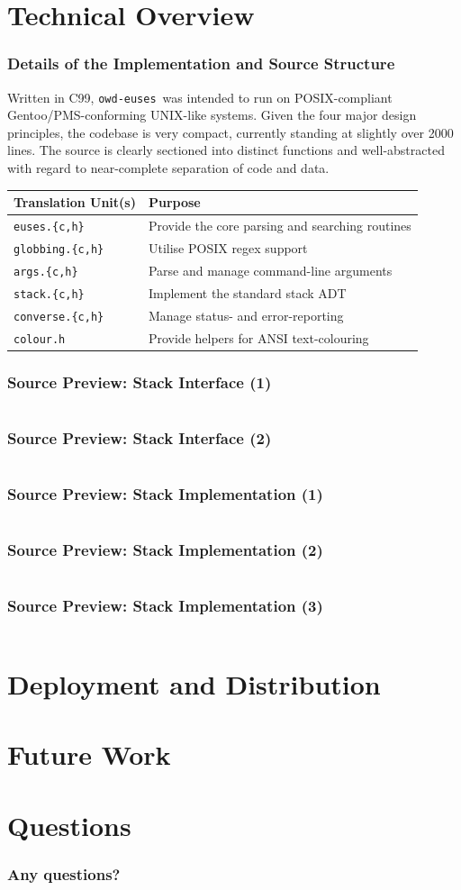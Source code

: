 \documentclass{beamer}
\numberwithin{figure}{section}
\newcommand\chext{.{\fontfamily{cmr}\{}c,h{\fontfamily{cmr}\}}}
\newcounter{firstsrcline}
\newcounter{lastsrcline}
\newcommand\srclinelimit{29}
\newcommand\resetsrclines{%
    \setcounter{firstsrcline}{1}
    \setcounter{lastsrcline}{\thefirstsrcline+\srclinelimit}
}
\newcommand\continuesource[1]{%
    \inputminted[firstline=\thefirstsrcline, lastline=\thelastsrcline,
        firstnumber=\thefirstsrcline]{c}{listings/#1}
    \setcounter{firstsrcline}{\thelastsrcline+1}
    \setcounter{lastsrcline}{\thefirstsrcline+\srclinelimit}
}
\newcommand\programname{\texttt{owd-euses}}
\begin{document}
\section{Technical Overview}
\begin{frame}
    \frametitle{Details of the Implementation and Source Structure}
    Written in C99, \programname\ was intended to run on POSIX-compliant
    Gentoo/PMS-conforming UNIX-like systems. Given the four major design
    principles, the codebase is very compact, currently standing at slightly
    over 2000 lines. The source is clearly sectioned into distinct functions and
    well-abstracted with regard to near-complete separation of code and data.
    \pause

    \begin{center}
        \begin{tabular}{ll}
            \hline
            \textbf{Translation Unit(s)} & \textbf{Purpose} \\
            \hline
            \texttt{euses\chext} & Provide the core parsing and searching
                routines \\
            \texttt{globbing\chext} & Utilise POSIX regex support \\
            \texttt{args\chext} & Parse and manage command-line arguments \\
            \texttt{stack\chext} & Implement the standard stack ADT \\
            \texttt{converse\chext} & Manage status- and error-reporting \\
            \texttt{colour.h} & Provide helpers for ANSI text-colouring \\
            \hline
        \end{tabular}
    \end{center}
\end{frame}
\begin{frame}
    \frametitle{Source Preview: Stack Interface (1)}
    \resetsrclines
    \continuesource{stack.h}
\end{frame}
\begin{frame}
    \frametitle{Source Preview: Stack Interface (2)}
    \continuesource{stack.h}
\end{frame}
\begin{frame}
    \frametitle{Source Preview: Stack Implementation (1)}
    \resetsrclines
    \continuesource{stack.c}
\end{frame}
\begin{frame}
    \frametitle{Source Preview: Stack Implementation (2)}
    \continuesource{stack.c}
\end{frame}
\begin{frame}
    \frametitle{Source Preview: Stack Implementation (3)}
    \continuesource{stack.c}
\end{frame}
\section{Deployment and Distribution}
\section{Future Work}
\section{Questions}
\begin{frame}
    \frametitle{Any questions?}
\end{frame}
\end{document}
